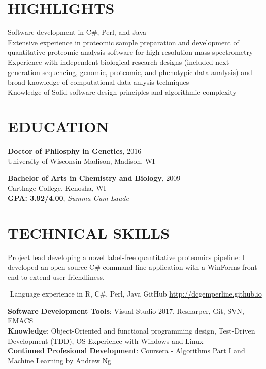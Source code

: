 \documentclass[line]{res}
\begin{document}
 


\address{2354 Colfax Ln, Indianapolis, IN 46260}
\address{dcgemperline@gmail.com 608-886-8571}


\begin{resume}

\section{HIGHLIGHTS}
Software development in C\#, Perl, and Java \\
\vspace{0.1in}	
Extensive experience in proteomic sample preparation and development of quantitative proteomic analysis software for high resolution mass spectrometry \\
\vspace{0.1in}	
Experience with independent biological research designs (included next generation sequencing, genomic, proteomic, and phenotypic data analysis) and broad knowledge of computational data anlysis techniques \\
\vspace{0.1in}	
Knowledge of Solid software design principles and algorithmic complexity

\section{EDUCATION}          
\textbf{Doctor of Philosphy in Genetics}, 2016 \\
University of Wisconsin-Madison, Madison, WI

\textbf{Bachelor of Arts in Chemistry and Biology}, 2009 \\
Carthage College, Kenosha, WI \\
\textbf{GPA: 3.92/4.00}, \textit{Summa Cum Laude}

\section{TECHNICAL SKILLS}
Project lead developing a novel label-free quantitative proteomics pipeline: I developed an open-source C\# command line application with a WinForms front-end to extend user friendliness.
\vspace{-0.2in}	
\begin{tabbing}
   \hspace{3.0in}\= \kill %
   Language experience in R, C\#, Perl, Java \> GitHub \url{http://dcgemperline.github.io} \\
\end{tabbing} \vspace{-20pt}
\textbf{Software Development Tools}: Visual Studio 2017, Resharper, Git, SVN, EMACS \\
\textbf{Knowledge}: Object-Oriented and functional programming design, Test-Driven Development (TDD), OS Experience with Windows and Linux \\
\textbf{Continued Profesional Development}: Coursera - Algorithms Part I and Machine Learning by Andrew Ng


\end{resume}
\end{document}
